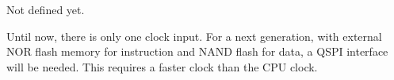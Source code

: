 Not defined yet.

Until now, there is only one clock input. For a next generation, with external NOR flash memory for instruction and NAND flash for data, a QSPI interface will be needed. This requires a faster clock than the CPU clock.